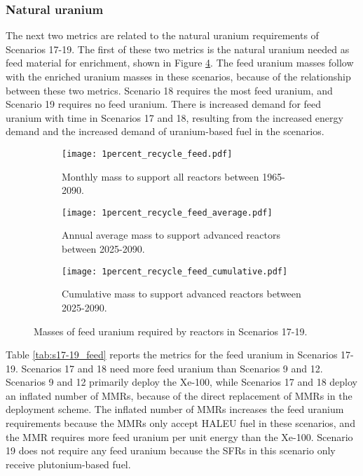 \subsubsection{Natural uranium}
The next two metrics are related to the natural uranium requirements of 
Scenarios 17-19. The first of these two metrics is the 
natural uranium needed as feed material for enrichment, shown in 
Figure \ref{fig:1percent_recycle_feed}. The feed uranium masses follow with 
the enriched uranium masses in these scenarios, because of 
the relationship between these two metrics. Scenario 18 requires 
the most feed uranium, and Scenario 19 requires no feed uranium. 
There is increased demand for feed uranium with time in Scenarios 17 
and 18, resulting from the increased energy demand 
and the increased demand of uranium-based fuel in the scenarios.  

\begin{figure}[h!]
    \centering
    \begin{subfigure}[b]{0.45\textwidth}
        \centering
        \texttt{[image: 1percent\_recycle\_feed.pdf]}
        \caption{Monthly mass to support all reactors 
        between 1965-2090.}
        \label{fig:1percent_recycle_all_feed}
    \end{subfigure}
    \hfill
    \begin{subfigure}[b]{0.45\textwidth}
        \centering
        \texttt{[image: 1percent\_recycle\_feed\_average.pdf]}
        \caption{Annual average mass to support
        advanced reactors between 2025-2090.}
        \label{fig:1percent_recycle_AR_feed}
    \end{subfigure}
    \begin{subfigure}[b]{0.45\textwidth}
        \centering
        \texttt{[image: 1percent\_recycle\_feed\_cumulative.pdf]}
        \caption{Cumulative mass to support advanced reactors between 2025-2090.}
        \label{fig:1percent_recycle_feed_cumulative}
    \end{subfigure}
       \caption{Masses of feed uranium required by reactors
        in Scenarios 17-19.}
       \label{fig:1percent_recycle_feed}
\end{figure}

Table \ref{tab:s17-19_feed} reports the metrics for the feed uranium in 
Scenarios 17-19. Scenarios 17 and 18 need more feed uranium than 
Scenarios 9 and 12. Scenarios 9 and 12 primarily deploy the Xe-100,
while Scenarios 17 and 18 deploy an inflated number of \glspl{MMR}, 
because of the direct replacement of \glspl{MMR} in the deployment 
scheme. The inflated number of \glspl{MMR} increases the 
feed uranium requirements because the \glspl{MMR} only accept 
\gls{HALEU} fuel in these scenarios, and the \gls{MMR} requires 
more feed uranium per unit energy than the Xe-100. Scenario 19 does not 
require any feed uranium because the \glspl{SFR} in this scenario 
only receive plutonium-based fuel. 

